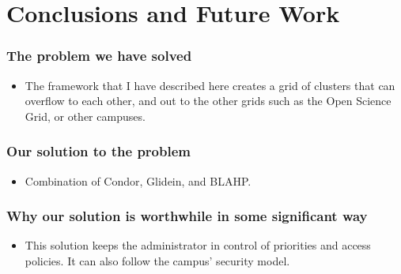 \documentclass[11pt]{article}
\begin{document}
\section{Conclusions and Future Work}
\label{sec:Conclusion}

\subsubsection*{The problem we have solved}
\begin{itemize}


\item
The framework that I have described here creates a grid of clusters that can overflow to each other, and out to the other grids such as the Open Science Grid, or other campuses.  

\end{itemize}



\subsubsection*{Our solution to the problem}
\begin{itemize}



\item
Combination of Condor, Glidein, and BLAHP.

\end{itemize}



\subsubsection*{Why our solution is worthwhile in some significant way}
\begin{itemize}


\item
This solution keeps the administrator in control of priorities and access policies.  It can also follow the campus' security model.

\end{itemize}
\end{document}
